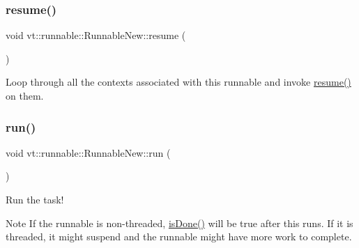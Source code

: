 \mbox{\label{structvt_1_1runnable_1_1_runnable_new_a4d38f8f4d413457a40f134a57480449d}} 
\subsubsection{\texorpdfstring{resume()}{resume()}}
{\footnotesize\ttfamily void vt\+::runnable\+::\+Runnable\+New\+::resume (\begin{DoxyParamCaption}{ }\end{DoxyParamCaption})\hspace{0.3cm}{\ttfamily [private]}}



Loop through all the contexts associated with this runnable and invoke {\ttfamily \hyperlink{structvt_1_1runnable_1_1_runnable_new_a4d38f8f4d413457a40f134a57480449d}{resume()}} on them. 

\mbox{\label{structvt_1_1runnable_1_1_runnable_new_a3fa6c8ee2214c074c748000f782ad793}} 
\subsubsection{\texorpdfstring{run()}{run()}}
{\footnotesize\ttfamily void vt\+::runnable\+::\+Runnable\+New\+::run (\begin{DoxyParamCaption}{ }\end{DoxyParamCaption})}



Run the task! 

\begin{DoxyNote}{Note}
If the runnable is non-\/threaded, {\ttfamily \hyperlink{structvt_1_1runnable_1_1_runnable_new_ad9acf28ef0fed7a7d63a9ca1d3ba3efc}{is\+Done()}} will be {\ttfamily true} after this runs. If it is threaded, it might suspend and the runnable might have more work to complete. 
\end{DoxyNote}
\mbox{\label{structvt_1_1runnable_1_1_runnable_new_a997203eb54dc62151d11211384cf335f}} 
